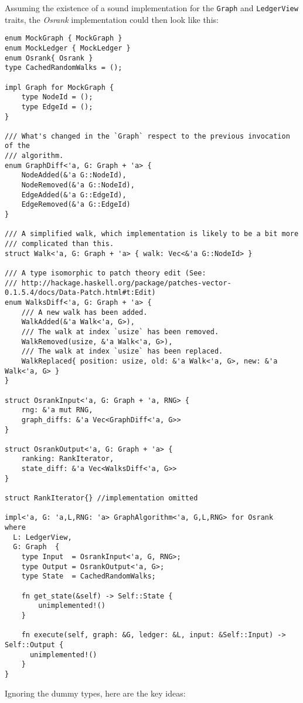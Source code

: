 \documentclass{article}
\begin{document}
Assuming the existence of a sound implementation for
the \texttt{Graph} and \texttt{LedgerView} traits,
the \textit{Osrank} implementation could then look like this:

\begin{verbatim}
enum MockGraph { MockGraph }
enum MockLedger { MockLedger }
enum Osrank{ Osrank }
type CachedRandomWalks = ();

impl Graph for MockGraph {
    type NodeId = ();
    type EdgeId = ();
}

/// What's changed in the `Graph` respect to the previous invocation of the
/// algorithm.
enum GraphDiff<'a, G: Graph + 'a> {
    NodeAdded(&'a G::NodeId),
    NodeRemoved(&'a G::NodeId),
    EdgeAdded(&'a G::EdgeId),
    EdgeRemoved(&'a G::EdgeId)
}

/// A simplified walk, which implementation is likely to be a bit more
/// complicated than this.
struct Walk<'a, G: Graph + 'a> { walk: Vec<&'a G::NodeId> }

/// A type isomorphic to patch theory edit (See:
/// http://hackage.haskell.org/package/patches-vector-0.1.5.4/docs/Data-Patch.html#t:Edit)
enum WalksDiff<'a, G: Graph + 'a> {
    /// A new walk has been added.
    WalkAdded(&'a Walk<'a, G>),
    /// The walk at index `usize` has been removed.
    WalkRemoved(usize, &'a Walk<'a, G>),
    /// The walk at index `usize` has been replaced.
    WalkReplaced{ position: usize, old: &'a Walk<'a, G>, new: &'a Walk<'a, G> }
}

struct OsrankInput<'a, G: Graph + 'a, RNG> {
    rng: &'a mut RNG,
    graph_diffs: &'a Vec<GraphDiff<'a, G>>
}

struct OsrankOutput<'a, G: Graph + 'a> {
    ranking: RankIterator,
    state_diff: &'a Vec<WalksDiff<'a, G>>
}

struct RankIterator{} //implementation omitted

impl<'a, G: 'a,L,RNG: 'a> GraphAlgorithm<'a, G,L,RNG> for Osrank
where
  L: LedgerView,
  G: Graph  {
    type Input  = OsrankInput<'a, G, RNG>;
    type Output = OsrankOutput<'a, G>;
    type State  = CachedRandomWalks;

    fn get_state(&self) -> Self::State {
        unimplemented!()
    }

    fn execute(self, graph: &G, ledger: &L, input: &Self::Input) -> Self::Output {
      unimplemented!()
    }
}
\end{verbatim}

Ignoring the dummy types, here are the key ideas:
\end{document}
